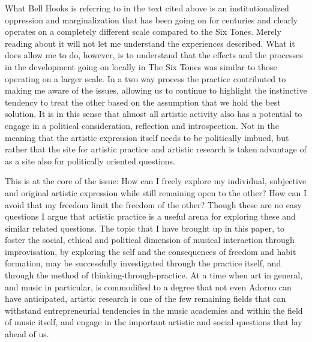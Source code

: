 \documentclass[a4paper]{article}
\begin{document}
What Bell Hooks is referring to in the text cited above is an institutionalized oppression and marginalization that has been going on for centuries and clearly operates on a completely different scale compared to the Six Tones. Merely reading about it will not let me understand the experiences described. What it does allow me to do, however, is to understand that the effects and the processes in the development going on locally in The Six Tones was similar to those operating on a larger scale. In a two way process the practice contributed to making me aware of the issues, allowing us to continue to highlight the instinctive tendency to treat the other based on the assumption that we hold the best solution. It is in this sense that almost all artistic activity also has a potential to engage in a political consideration, reflection and introspection. Not in the meaning that the artistic expression itself needs to be politically imbued, but rather that the site for artistic practice and artistic research is taken advantage of as a site also for politically oriented questions. 

This is at the core of the issue: How can I freely explore my individual, subjective and original artistic expression while still remaining open to the other? How can I avoid that my freedom limit the freedom of the other? Though these are no easy questions I argue that artistic practice is a useful arena for exploring these and similar related questions. The topic that I have brought up in this paper, to foster the social, ethical and political dimension of musical interaction through improvisation, by exploring the self and the consequences of freedom and habit formation, may be successfully investigated through the practice itself, and through the method of thinking-through-practice. At a time when art in general, and music in particular, is commodified to a degree that not even Adorno can have anticipated, artistic research is one of the few remaining fields that can withstand entrepreneurial tendencies in the music academies and within the field of music itself, and engage in the important artistic and social questions that lay ahead of us. 



\nocite{biggs10}
 
\end{document}
